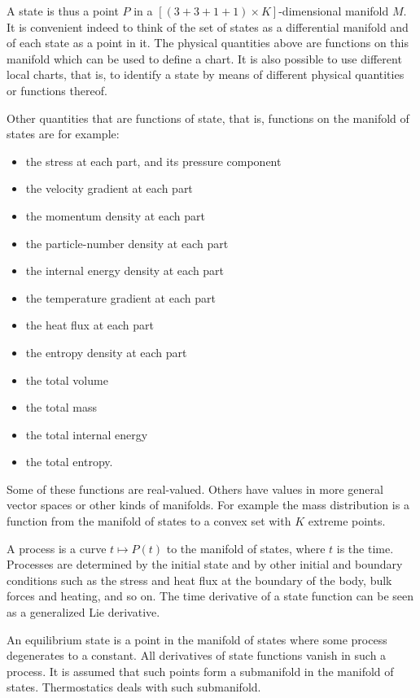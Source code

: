 \documentclass[\ifafour a4paper,12pt,\else a5paper,10pt,\fi%
onecolumn,oneside,article,%
british%
]{memoir}
\theoremstyle{remark}
\theoremstyle{innote}
\renewcommand*{\|}[1][]{\nonscript\,#1\vert\nonscript\;\mathopen{}}
\begin{document}
A state is thus a point $P$ in a $[(3+3+1+1)\times K]$-dimensional manifold $M$. It
is convenient indeed to think of the set of states as a differential
manifold and of each state as a point in it. The physical quantities above are
functions on this manifold which can be used to define a chart. It is also
possible to use different local charts, that is, to identify a state by
means of different physical quantities or functions thereof.

Other quantities that are functions of state, that is, functions on the
manifold of states are for example:
\begin{itemize}
\item the stress at each part, and its pressure component
\item the velocity gradient at each part
\item the momentum density at each part
\item the particle-number density at each part
\item the internal energy density at each part
\item the temperature gradient at each part
\item the heat flux at each part
\item the entropy density at each part
\item the total volume
\item the total mass
\item the total internal energy
\item the total entropy.
\end{itemize}

Some of these functions are real-valued. Others have values in more general
vector spaces or other kinds of manifolds. For example the mass
distribution is a function from the manifold of states to a convex set with
$K$ extreme points.

A process is a curve $t \mapsto P(t)$ to the manifold of states, where $t$
is the time. Processes
are determined by the initial state and by other initial and boundary
conditions such as the stress and heat flux at the boundary of the body,
bulk forces and heating, and so on. The time derivative of a state function
can be seen as a generalized Lie derivative.

\bigskip

An equilibrium state is a point in the manifold of states where some process
degenerates to a constant. All derivatives of state functions vanish in
such a process. It is assumed that such points form a submanifold in the
manifold of states. Thermostatics deals with such submanifold.
\end{document}
